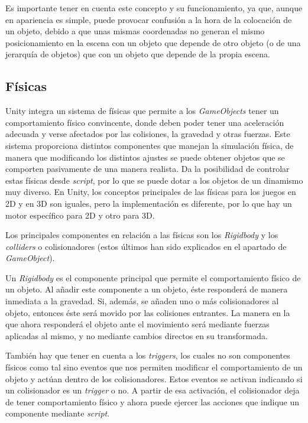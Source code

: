 Es importante tener en cuenta este concepto y su funcionamiento, ya que, aunque en apariencia es simple, puede provocar confusión a la hora de la colocación de un objeto, debido a que unas mismas coordenadas no generan el mismo posicionamiento en la escena con un objeto que depende de otro objeto (o de una jerarquía de objetos) que con un objeto que depende de la propia escena.

\subsection{Físicas}

Unity integra un sistema de físicas que permite a los \textit{GameObjects} tener un comportamiento físico convincente, donde deben poder tener una aceleración adecuada y verse afectados por las colisiones, la gravedad y otras fuerzas. Este sistema proporciona distintos componentes que manejan la simulación física, de manera que modificando los distintos ajustes se puede obtener objetos que se comporten pasivamente de una manera realista. Da la posibilidad de controlar estas físicas desde \textit{script}, por lo que se puede dotar a los objetos de un dinamismo muy diverso. En Unity, los conceptos principales de las físicas para los juegos en 2D y en 3D son iguales, pero la implementación es diferente, por lo que hay un motor específico para 2D y otro para 3D.

Los principales componentes en relación a las físicas son los \textit{Rigidbody} y los \textit{colliders} o colisionadores (estos últimos han sido explicados en el apartado de \textit{GameObject}). 

Un \textit{Rigidbody} es el componente principal que permite el comportamiento físico de un objeto. Al añadir este componente a un objeto, éste responderá de manera inmediata a la gravedad. Si, además, se añaden uno o más colisionadores al objeto, entonces éste será movido por las colisiones entrantes. La manera en la que ahora responderá el objeto ante el movimiento será mediante fuerzas aplicadas al mismo, y no mediante cambios directos en su transformada.

También hay que tener en cuenta a los \textit{triggers}, los cuales no son componentes físicos como tal sino eventos que nos permiten modificar el comportamiento de un objeto y actúan dentro de los colisionadores. Estos eventos se activan indicando si un colisionador es un \textit{trigger} o no. A partir de esa activación, el colisionador deja de tener comportamiento físico y ahora puede ejercer las acciones que indique un componente mediante \textit{script}.

